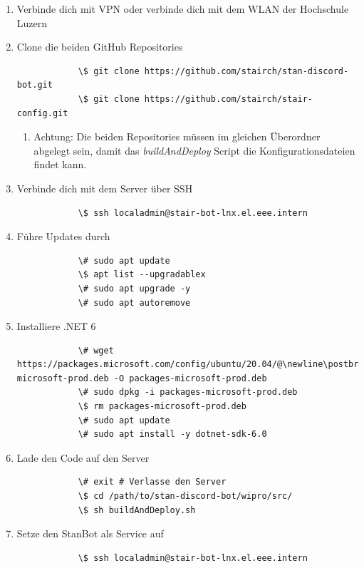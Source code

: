 \documentclass[a4paper, table]{article}
\begin{document}
\begin{enumerate}
    \item Verbinde dich mit VPN oder verbinde dich mit dem WLAN der Hochschule Luzern
    \item Clone die beiden GitHub Repositories
        \begin{lstlisting}
            \$ git clone https://github.com/stairch/stan-discord-bot.git
            \$ git clone https://github.com/stairch/stair-config.git
        \end{lstlisting}
        \begin{enumerate}
            \item Achtung: Die beiden Repositories müssen im gleichen Überordner abgelegt sein, damit das \textit{buildAndDeploy} Script die Konfigurationsdateien findet kann.
        \end{enumerate}
    \item Verbinde dich mit dem Server über SSH
        \begin{lstlisting}
            \$ ssh localadmin@stair-bot-lnx.el.eee.intern
        \end{lstlisting}
    \item Führe Updates durch
        \begin{lstlisting}
            \# sudo apt update
            \$ apt list --upgradablex
            \# sudo apt upgrade -y
            \# sudo apt autoremove
        \end{lstlisting}
    \item Installiere .NET 6
        \begin{verbatim}
            \# wget https://packages.microsoft.com/config/ubuntu/20.04/@\newline\postbreak@packages-microsoft-prod.deb -O packages-microsoft-prod.deb
            \# sudo dpkg -i packages-microsoft-prod.deb
            \$ rm packages-microsoft-prod.deb
            \# sudo apt update
            \# sudo apt install -y dotnet-sdk-6.0
        \end{verbatim}
    \item Lade den Code auf den Server
        \begin{lstlisting}
            \# exit # Verlasse den Server
            \$ cd /path/to/stan-discord-bot/wipro/src/
            \$ sh buildAndDeploy.sh
        \end{lstlisting}
    \item Setze den StanBot als Service auf
        \begin{lstlisting}
            \$ ssh localadmin@stair-bot-lnx.el.eee.intern

\end{lstlisting}
\end{enumerate}
\end{document}
